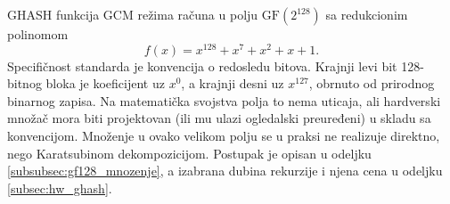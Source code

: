 GHASH funkcija GCM režima računa u polju $\mathrm{GF}(2^{128})$ sa redukcionim polinomom
\begin{equation}
    f(x) = x^{128} + x^7 + x^2 + x + 1.
\end{equation}
Specifičnost standarda \cite{sp80038d} je konvencija o redosledu bitova. Krajnji levi bit 128-bitnog bloka je koeficijent uz $x^0$, a krajnji desni uz $x^{127}$, obrnuto od prirodnog binarnog zapisa. Na matematička svojstva polja to nema uticaja, ali hardverski množač mora biti projektovan (ili mu ulazi ogledalski preuređeni) u skladu sa konvencijom. Množenje u ovako velikom polju se u praksi ne realizuje direktno, nego Karatsubinom dekompozicijom. Postupak je opisan u odeljku \ref{subsubsec:gf128_mnozenje}, a izabrana dubina rekurzije i njena cena u odeljku \ref{subsec:hw_ghash}.
